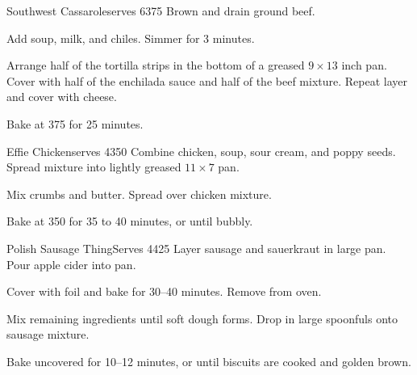 
\begin{recipe}{Southwest Cassarole}{serves 6}{375\0}
    Brown and drain ground beef.

    Add soup, milk, and chiles. Simmer for 3 minutes.

    Arrange half of the tortilla strips in the bottom of a greased $9 \times 13$ inch pan. Cover with half of the enchilada sauce and half of the beef mixture. Repeat layer and cover with cheese.

    \newstep
    Bake at 375\0 for 25 minutes.

\end{recipe}

\begin{recipe}{Effie Chicken}{serves 4}{350\0}
    Combine chicken, soup, sour cream, and poppy seeds. Spread mixture into lightly greased $11\times7$ pan.

    Mix crumbs and butter. Spread over chicken mixture.

    \newstep
    Bake at 350\0 for 35 to 40 minutes, or until bubbly.
\end{recipe}

\begin{recipe}{Polish Sausage Thing}{Serves 4}{425\0}
    Layer sausage and sauerkraut in large pan. Pour apple cider into pan.

    \newstep
    Cover with foil and bake for 30--40 minutes. Remove from oven.

    Mix remaining ingredients until soft dough forms. Drop in large spoonfuls onto sausage mixture.

    \newstep
    Bake uncovered for 10--12 minutes, or until biscuits are cooked and golden brown.
\end{recipe}
